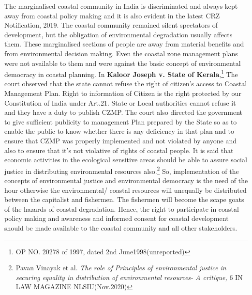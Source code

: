 \begin{multicols}{2}
\noi
The marginalised coastal community in India is discriminated and always kept away from
coastal policy making and it is also evident in the latest CRZ Notification, 2019. The coastal
community remained silent spectators of development, but the obligation of environmental
degradation usually affects them. These marginalised sections of people are away from
material benefits and from environmental decision making. Even the coastal zone
management plans were not available to them and were against the basic concept of
environmental democracy in coastal planning. In \textbf{Kaloor Joseph v. State of Kerala},\footnote{OP NO. 20278 of 1997, dated 2nd June1998(unreported)} The
court observed that the state cannot refuse the right of citizen’s access to Coastal  
Management Plan. Right to information of Citizen is the right protected by our Constitution
of India under Art.21. State or Local authorities cannot refuse it and they have a duty to
publish CZMP. The court also directed the government to give sufficient publicity to
management Plan prepared by the State so as to enable the public to know whether there is
any deficiency in that plan and to ensure that CZMP was properly implemented and not
violated by anyone and also to ensure that it’s not violative of rights of coastal people. It is
said that economic activities in the ecological sensitive areas should be able to assure social
justice in distributing environmental resources also.\footnote{Pavan Vinayak et al. \textit{The role of Principles of environmental justice in securing equality in distribution of environmental resources- A critique,} 6 IN LAW MAGAZINE NLSIU(Nov.2020)} So, implementation of the concepts of
environmental justice and environmental democracy is the need of the hour otherwise the
environmental/ coastal resources will unequally be distributed between the capitalist and
fishermen. The fishermen will become the scape goats of the hazards of coastal degradation.
Hence, the right to participate in coastal policy making and awareness and informed consent
for coastal development should be made available to the coastal community and all other
stakeholders.



\end{multicols}
